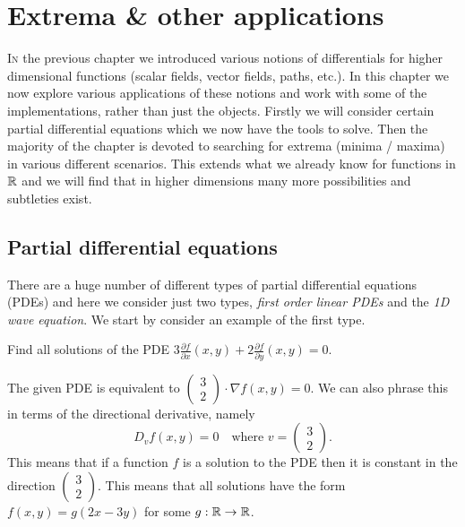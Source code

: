 \chapter{Extrema \& other applications}
\bookletstart

\lettrine{I}{n} the previous chapter we introduced various notions of differentials for higher dimensional functions (scalar fields, vector fields, paths, etc.).
In this chapter we now explore various applications of these notions and work with some of the implementations, rather than just the objects.
Firstly we will consider certain partial differential equations which we now have the tools to solve.
Then the majority of the chapter is devoted to searching for extrema (minima / maxima) in various different scenarios.
This extends what we already know for functions in \(\mathbb{R}\) and we will find that in higher dimensions many more possibilities and subtleties exist.

\section{Partial differential equations}

There are a huge number of different types of partial differential equations (PDEs) and here we consider just two types, \emph{first order linear PDEs} and the \emph{1D wave equation}.
We start by consider an example of the first type.

\begin{example*}
    Find all solutions of the PDE
    \(3 \frac{\partial f}{\partial x}(x,y) + 2 \frac{\partial f}{\partial y} (x,y) = 0\).
\end{example*}

\begin{solution}
    The given PDE is equivalent to
    \(\left( \begin{smallmatrix}
            3 \\ 2
        \end{smallmatrix} \right)
    \cdot
    \nabla f(x,y) =0\).
    We can also phrase this in terms of the directional derivative, namely
    \[
        D_{v}f(x,y) = 0 \quad \text{where \(v=\left( \begin{smallmatrix}
                3 \\ 2
            \end{smallmatrix} \right)\)}.
    \]
    This means that if a function \(f\) is a solution to the PDE then it is constant in the direction \(\left( \begin{smallmatrix}
            3 \\ 2
        \end{smallmatrix} \right)\).
    This means that all solutions have the form \(f(x,y) = g(2x-3y)\) for some \(g:\mathbb{R} \to \mathbb{R}\).
\end{solution}

